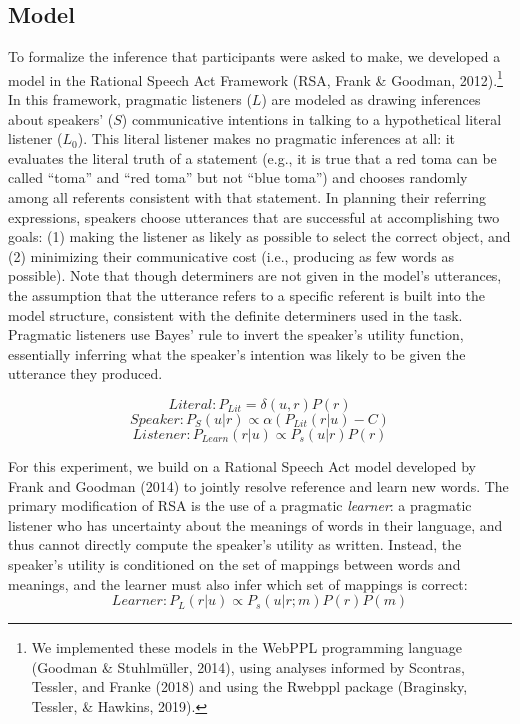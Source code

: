 \documentclass[
  english,
  man,floatsintext]{apa6}
\begin{document}
\hypertarget{model}{%
\subsection{Model}\label{model}}

To formalize the inference that participants were asked to make, we developed a model in the Rational Speech Act Framework (RSA, Frank \& Goodman, 2012).\footnote{We implemented these models in the WebPPL programming language (Goodman \& Stuhlmüller, 2014), using analyses informed by Scontras, Tessler, and Franke (2018) and using the Rwebppl package (Braginsky, Tessler, \& Hawkins, 2019).} In this framework, pragmatic listeners (\(L\)) are modeled as drawing inferences about speakers' (\(S\)) communicative intentions in talking to a hypothetical literal listener (\(L_{0}\)). This literal listener makes no pragmatic inferences at all: it evaluates the literal truth of a statement (e.g., it is true that a red toma can be called ``toma'' and ``red toma'' but not ``blue toma'') and chooses randomly among all referents consistent with that statement. In planning their referring expressions, speakers choose utterances that are successful at accomplishing two goals: (1) making the listener as likely as possible to select the correct object, and (2) minimizing their communicative cost (i.e., producing as few words as possible). Note that though determiners are not given in the model's utterances, the assumption that the utterance refers to a specific referent is built into the model structure, consistent with the definite determiners used in the task. Pragmatic listeners use Bayes' rule to invert the speaker's utility function, essentially inferring what the speaker's intention was likely to be given the utterance they produced.

\[Literal: P_{Lit} = \delta\left(u,r\right)P\left(r\right)\]
\[Speaker: P_S\left(u \vert r\right) \propto \alpha \left(P_{Lit}\left(r \vert u\right) - C\right)\]
\[Listener: P_{Learn}\left(r \vert u\right) \propto P_s\left(u \vert r\right)P\left(r\right)\]

For this experiment, we build on a Rational Speech Act model developed by Frank and Goodman (2014) to jointly resolve reference and learn new words. The primary modification of RSA is the use of a pragmatic \emph{learner}: a pragmatic listener who has uncertainty about the meanings of words in their language, and thus cannot directly compute the speaker's utility as written. Instead, the speaker's utility is conditioned on the set of mappings between words and meanings, and the learner must also infer which set of mappings is correct:\\
\[Learner: P_L\left(r \vert u\right) \propto P_s\left(u \vert r; m\right)P\left(r\right)P\left(m\right)\]
\end{document}
